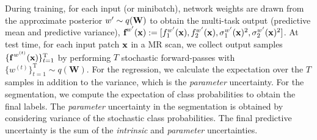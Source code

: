 During training, for each input (or minibatch), network weights are drawn from the approximate posterior $w' \sim q(\textbf{\text{W}})$ to obtain the multi-task output (predictive mean and predictive variance), $\textbf{f}^{w'}(\text{\textbf{x}}):=[f^{w'}_1(\text{\textbf{x}}),f^{w'}_2(\text{\textbf{x}}), \sigma_{1}^{w'}(\text{\textbf{x}})^{2},\sigma_{2}^{w'}(\text{\textbf{x}})^{2}]$. At test time, for each input patch $\textbf{\text{x}}$ in a MR scan, we collect output samples $\{\textbf{f}^{\,w^{(t)}}(\text{\textbf{x}})\}_{t=1}^{\text{T}}$ by performing $T$ stochastic forward-passes with $\{w^{(t)}\}_{t=1}^{\text{T}}\sim q(\mathbf{W})$. For the regression, we calculate the expectation over the $T$ samples in addition to the variance, which is the \emph{parameter} uncertainty. For the segmentation, we compute the expectation of class probabilities to obtain the final labels. The \emph{parameter} uncertainty in the segmentation is obtained by considering variance of the stochastic class probabilities. The final predictive uncertainty is the sum of the \emph{intrinsic} and \emph{parameter} uncertainties.



